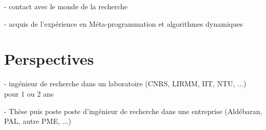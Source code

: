 \documentclass{report}
\begin{document}
- contact avec le monde de la recherche

- acquis de l'expérience en Méta-programmation et algorithmes dynamiques


\section*{Perspectives}

- ingénieur de recherche dans un laboratoire (CNRS, LIRMM, IIT, NTU, ...) pour 1 ou 2 ans

- Thèse puis poste poste d'ingénieur de recherche dans une entreprise (Aldébaran, PAL, autre PME, ...)



\appendix




\clearpage
{}

\end{document}
